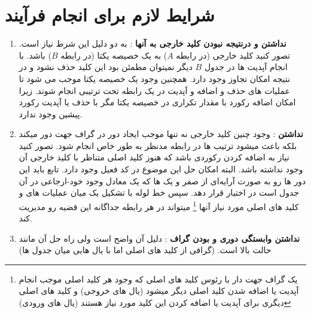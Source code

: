 \documentclass{article}
\begin{document}
\section*{شرایط لازم برای انجام فرآیند }
\begin{enumerate}
	\item 
	\textbf{
		نداشتن  و درنتیجه نبودن کلید خارجی به آنها
	}:
	به دو دلیل این شرط نیاز است. تصور کنید کلید خارجی (در رابطه $A$) به یک خصیصه یکتا (در رابطه $B$) باشد. با انجام آپدیت ها در جدول $B$ دیگر نمیتوان مطمئن بود این کلید حذف نشود و در نتیجه امکان تجاوز 
	وجود دارد. همچنین وجود یک خصیصه یکتا موجب می شود تا عملیات های حذف و اضافه و آپدیت در یک رابطه تحت ترتیبی انجام شوند. زیرا امکان اضافه رکورد با مقدار تکراری در خصیصه یکتا مگر با حذف یا آپدیت رکورد پیشین وجود ندارد.
	\item
	\textbf{
	نداشتن 
	}:
وجود چنین کلید خارجی نه تنها موجب ایجاد دور در گراف جهت دور میکند بلکه باعث میشود ترتیب 
ها در رابطه مدنظر به طور خاص انجام شود. تصور کنید نیاز به اضافه کردن رکوردی باشد که هنوز کلید اصلی متناظر با کلید خارجی آن وجود نداشته باشد. البته امکان حل این موضوع در کد فعیل وجود دارد. تابع  باید این دور ها رو به صورت آرایه‌ای از صفر و یک ها که یک معادل وجود خود-ارجاعی در آن جدول است در اختیار 
قرار دهد. سپس خط لوله با تشکیل یک 
میان عملیات های 
و کلید های اصلی مورد نیاز آنها
	\footnote{
	یک گراف جهت دار با رئوس کلید های اصلی که وجود هر کلید اصلی موجب انجام آپدیت یا اضافه شدن کلید اصلی دیگر میشود (یال های خروجی) و کلید های اصلی دیگری برای آپدیت یا اضافه کردن این کلید مورد نیاز هستند (یال های ورودی)
	}
 میتواند در هر رابطه جداگانه این قضیه رو مدیریت کند.
	\item
	\textbf{
		نداشتن وابستگی دوری و  بودن گراف
	}:
دلیل آن واضح است ولی راه حل آن مانند حالت بالا است. (گرافی از کلید های اصلی اما با یال هایی میان جدول ها)
\end{enumerate}
\end{document}
